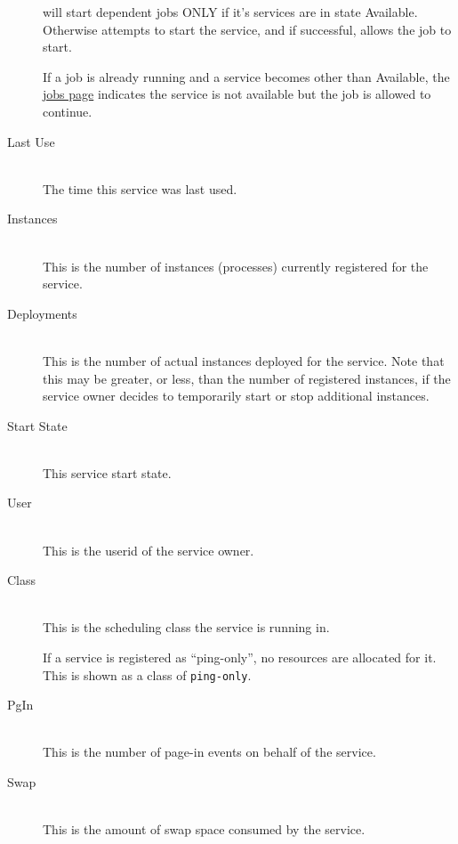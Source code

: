 \begin{description}
              {\DUCC} will start dependent jobs ONLY if it's services are in state Available.  Otherwise
              {\DUCC} attempts to start the service, and if successful, allows the job to start.  

              If a job is already running and a service becomes other than Available, the
              \hyperref[sec:ws.jobs-page]{jobs page} indicates the service is not available but the job is 
              allowed to continue.
              
            \item[Last Use] \hfill \\
              The time this service was last used.
              
            \item[Instances] \hfill \\
              This is the number of instances (processes) currently registered for the service.  

            \item[Deployments] \hfill \\
              This is the number of actual instances deployed for the service.  Note that this may
              be greater, or less, than the number of registered instances, if the service owner
              decides to temporarily start or stop additional instances.

            \item[Start State] \hfill \\
              This service start state.

            \item[User] \hfill \\
              This is the userid of the service owner.
              
            \item[Class] \hfill \\
              This is the scheduling class the service is running in. 
              
              If a service is registered as ``ping-only'', no resources are allocated for it.  This
              is shown as a class of {\tt ping-only}.
                
      		\item[PgIn] \hfill \\
        	This is the number of page-in events on behalf of the service.

      		\item[Swap] \hfill \\
        	This is the amount of swap space consumed by the service.
        

\end{description}
